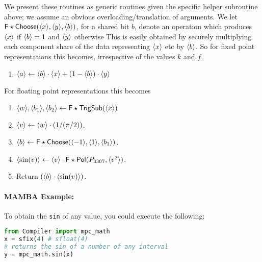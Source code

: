   We present these routines as generic routines given the specific helper subroutine above;
  we assume an obvious overloading/translation of arguments.
  We let $\mathsf{F\star Choose}(\langle x \rangle,\langle y \rangle,\langle b \rangle)$, for a
  shared bit $b$, denote an operation which produces $\langle x \rangle$ if $\langle b \rangle=1$
  and $\langle y \rangle$ otherwise
  This is easily obtained by securely multiplying each component share
  of the data representing $\langle x \rangle$ etc by $\langle b \rangle$.
  So for fixed point representations this becomes, irrespective of the
  values $k$ and $f$,
  \begin{enumerate}
    \item $\langle a \rangle \leftarrow \langle b \rangle\cdot \langle x \rangle+(1-\langle b \rangle) \cdot \langle y \rangle$
  \end{enumerate}
  For floating point representations this becomes
  \begin{enumerate}
    \item $\langle w \rangle, \langle b_1 \rangle, \langle b_2 \rangle \leftarrow \mathsf{F\star TrigSub}(\langle x \rangle)$
    \item $\langle v \rangle \leftarrow \langle w \rangle \cdot (1/(\pi/2))$.
    \item $\langle b \rangle \leftarrow \mathsf{F\star Choose}(\langle -1 \rangle,\langle 1 \rangle, \langle b_1 \rangle)$.
    \item $\langle \sin(v) \rangle \leftarrow \langle v \rangle \cdot \mathsf{F\star Pol}(P_{3307},\langle v^2 \rangle)$.
    \item Return $(\langle b \rangle \cdot \langle \sin(v) \rangle)$.
  \end{enumerate}

  \paragraph{MAMBA Example:} To obtain the \verb|sin| of any value, you could execute the following:
  \begin{lstlisting}[language={python}]
from Compiler import mpc_math
x = sfix(4) # sfloat(4)
# returns the sin of a number of any interval
y = mpc_math.sin(x)
\end{lstlisting}


